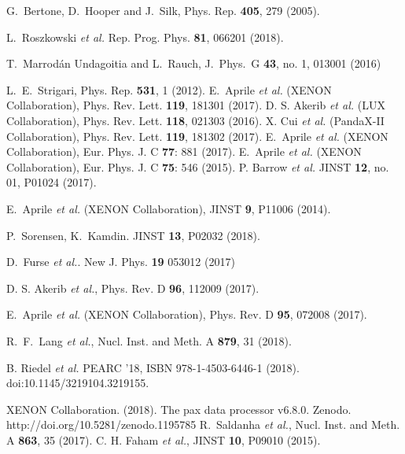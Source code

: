 \begin{thebibliography}{24}

 G.~Bertone, D.~Hooper and J.~Silk, Phys. Rep. \textbf{405}, 279 (2005).

 L.~Roszkowski {\it et al.} Rep. Prog. Phys. \textbf{81}, 066201 (2018). %

 T.~Marrod\'an Undagoitia and L.~Rauch, J.\ Phys.\ G {\bf 43}, no. 1, 013001 (2016)

 L.~E.~Strigari, Phys. Rep. \textbf{531}, 1 (2012).
 E.~Aprile {\it et al.} (XENON Collaboration), Phys. Rev. Lett. \textbf{119}, 181301 (2017). %
 D. S. Akerib {\it et al.} (LUX Collaboration), Phys. Rev. Lett. \textbf{118}, 021303 (2016). %
 X. Cui {\it et al.} (PandaX-II Collaboration), Phys. Rev. Lett. \textbf{119}, 181302 (2017). %
 E.~Aprile {\it et al.} (XENON Collaboration), Eur. Phys. J. C \textbf{77}: 881 (2017). %
 E.~Aprile {\it et al.} (XENON Collaboration), Eur. Phys. J. C \textbf{75}: 546 (2015). %
 P. Barrow {\it et al.} JINST \textbf{12}, no. 01, P01024 (2017). %

 E.~Aprile {\it et al.} (XENON Collaboration), JINST \textbf{9}, P11006 (2014). %

 P.~Sorensen, K.~Kamdin. JINST \textbf{13}, P02032 (2018). %

 D.~Furse {\it et al.}. New J. Phys. \textbf{19} 053012 (2017)

 D. S. Akerib {\it et al.}, Phys. Rev. D \textbf{96}, 112009 (2017). %

 E.~Aprile {\it et al.} (XENON Collaboration), Phys. Rev. D \textbf{95}, 072008 (2017).

 R.~F.~Lang {\it et al.}, Nucl. Inst. and Meth. A \textbf{879}, 31 (2018).

 B. Riedel {\it et al.} PEARC '18, ISBN 978-1-4503-6446-1 (2018). doi:10.1145/3219104.3219155.

 XENON Collaboration. (2018). The pax data processor v6.8.0. Zenodo. http://doi.org/10.5281/zenodo.1195785
 R.~Saldanha {\it et al.}, Nucl. Inst. and Meth. A \textbf{863}, 35 (2017). %
 C. H. Faham {\it et al.}, JINST \textbf{10}, P09010 (2015).



\end{thebibliography}
